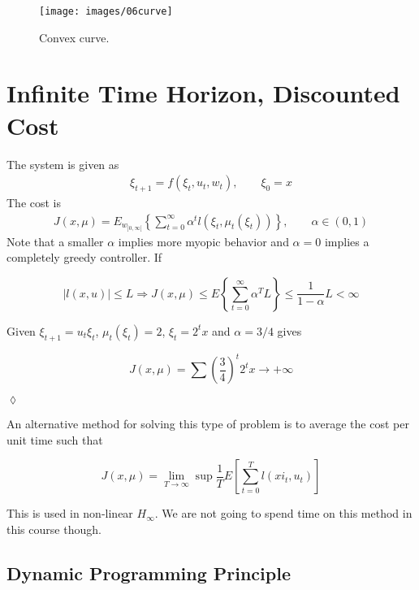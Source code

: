 \begin{figure}[ht!]
\centering
\texttt{[image: images/06curve]}
\caption{Convex curve.}%
\label{fig:06curve}
\end{figure}

\section{Infinite Time Horizon, Discounted Cost}
The system is given as
\begin{align*}
\xi_{t+1} = f(\xi_t,u_t,w_t), \qquad \xi_0 = x
\end{align*}
The cost is
\begin{align*}
J(x,\mu) = E_{w_{]0,\infty[}}\left\lbrace\sum_{t=0}^\infty \alpha^t l(\xi_t,\mu_t(\xi_t))\right\rbrace, \qquad \alpha\in(0,1)%
\end{align*}
Note that a smaller $\alpha$ implies more myopic behavior and $\alpha=0$ implies a completely greedy controller.
If

\begin{equation*}
|l(x,u)|\leq L \Rightarrow J(x,\mu)\leq E\left\lbrace\sum_{t=0}^\infty \alpha^T L\right\rbrace \leq \frac{1}{1-\alpha}L<\infty
\end{equation*}

\begin{example}
Given $\xi_{t+1}=u_t\xi_t$, $\mu_t(\xi_t)=2$, $\xi_t=2^t x$ and $\alpha=3/4$ gives

\begin{equation*}
J(x,\mu) = \sum{\left(\frac{3}{4}\right)}^t 2^t x\to+\infty
\end{equation*}

$\lozenge$
\end{example}

An alternative method for solving this type of problem is to average the cost per unit time such that

\begin{equation*}
J(x,\mu) = \lim_{T\to\infty}\sup \frac{1}{T}E\left[\sum_{t=0}^T l(xi_t,u_t)\right]
\end{equation*}

This is used in non-linear $H_\infty$.
We are not going to spend time on this method in this course though.

\subsection{Dynamic Programming Principle}

